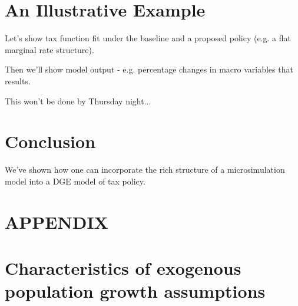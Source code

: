 \documentclass[letterpaper,12pt]{article}
\theoremstyle{definition}
\begin{document}
\begin{spacing}{1.5}
\section{An Illustrative Example}\label{SecResults}

Let's show tax function fit under the baseline and a proposed policy (e.g. a flat marginal rate structure).  

Then we'll show model output - e.g. percentage changes in macro variables that results.

This won't be done by Thursday night...

\section{Conclusion}\label{SecConclusion}

  We've shown how one can incorporate the rich structure of a microsimulation model into a DGE model of tax policy.  


\clearpage

\end{spacing}


\newpage



\newpage
\renewcommand{\theequation}{A.\arabic{section}.\arabic{equation}}
\renewcommand{\thesection}{A-\arabic{section}}   %
\setcounter{equation}{0}                         %
\setcounter{section}{0}                          %
\section*{APPENDIX}                              %

\section{Characteristics of exogenous population growth assumptions}\label{AppPopGrowth}
\end{document}
